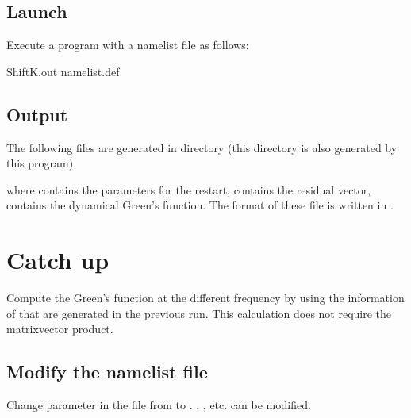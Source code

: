 \documentclass[letterpaper,10pt,dvipdfmx,openany,english]{sphinxmanual}
\begin{document}
\subsection{Launch}
\label{\detokenize{shiftk_flow_en:launch}}
Execute a program  with a namelist file 
as follows:

\begin{sphinxVerbatim}[commandchars=\\\{\}]
\PYGZdl{} ShiftK.out namelist.def
\end{sphinxVerbatim}


\subsection{Output}
\label{\detokenize{shiftk_flow_en:output}}
The following files are generated in  directory (this directory is
also generated by this program).

\begin{sphinxVerbatim}[commandchars=\\\{\}]
  
\end{sphinxVerbatim}

where
 contains the parameters for the restart,
 contains the residual vector,
 contains the dynamical Green’s function.
The format of these file is written in
{\hyperref[\detokenize{shiftk_format_en:revec}]{}} \sphinxhyphen{} {\hyperref[\detokenize{shiftk_format_en:dynamicalg}]{}}.


\section{Catch up}
\label{\detokenize{shiftk_flow_en:catch-up}}
Compute the Green’s function at the different frequency by using the information
of  that are generated in the previous run.
This calculation does not require the matrix\sphinxhyphen{}vector product.


\subsection{Modify the namelist file}
\label{\detokenize{shiftk_flow_en:modify-the-namelist-file}}
Change  parameter in the file 
from  to .
, , etc. can be modified.
\end{document}
